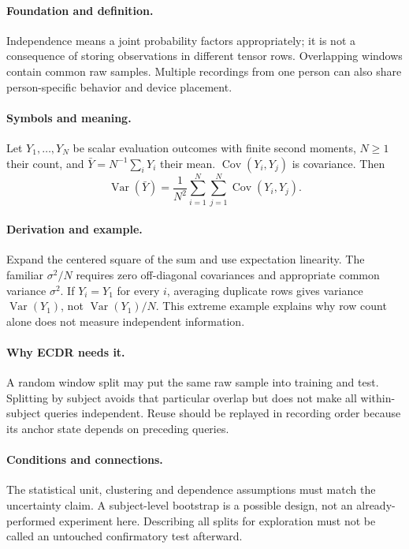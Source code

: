 \paragraph{Foundation and definition.}
Independence means a joint probability factors appropriately; it is not a
consequence of storing observations in different tensor rows. Overlapping
windows contain common raw samples. Multiple recordings from one person
can also share person-specific behavior and device placement.
\paragraph{Symbols and meaning.}
Let $Y_1,\ldots,Y_N$ be scalar evaluation outcomes with finite second
moments, $N\ge1$ their count, and $\bar Y=N^{-1}\sum_iY_i$ their mean.
$\operatorname{Cov}(Y_i,Y_j)$ is covariance. Then
\[
 \operatorname{Var}(\bar Y)=\frac1{N^2}
 \sum_{i=1}^{N}\sum_{j=1}^{N}\operatorname{Cov}(Y_i,Y_j).
\]
\paragraph{Derivation and example.}
Expand the centered square of the sum and use expectation linearity.
The familiar $\sigma^2/N$ requires zero off-diagonal covariances and
appropriate common variance $\sigma^2$. If $Y_i=Y_1$ for every $i$,
averaging duplicate rows gives variance $\operatorname{Var}(Y_1)$, not
$\operatorname{Var}(Y_1)/N$. This extreme example explains why row count
alone does not measure independent information.
\paragraph{Why ECDR needs it.}
A random window split may put the same raw sample into training and test.
Splitting by subject avoids that particular overlap but does not make all
within-subject queries independent. Reuse should be replayed in recording
order because its anchor state depends on preceding queries.
\paragraph{Conditions and connections.}
The statistical unit, clustering and dependence assumptions must match the
uncertainty claim. A subject-level bootstrap is a possible design, not an
already-performed experiment here. Describing all splits for exploration
must not be called an untouched confirmatory test afterward.

